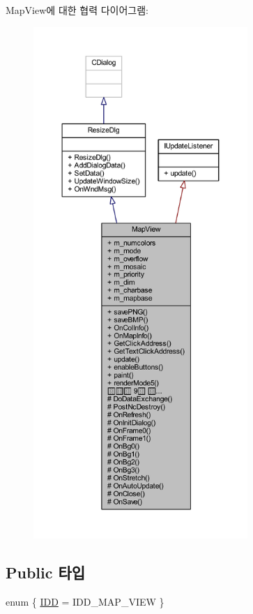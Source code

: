Map\+View에 대한 협력 다이어그램\+:\nopagebreak
\begin{figure}[H]
\begin{center}
\leavevmode
\includegraphics[height=550pt]{class_map_view__coll__graph}
\end{center}
\end{figure}
\subsection*{Public 타입}
\begin{DoxyCompactItemize}
\item 
enum \{ \mbox{\hyperlink{class_map_view_ad398582947c2a9b34e2217a782349299a9bcd3b06eb8616269560902b0a5ca782}{I\+DD}} = I\+D\+D\+\_\+\+M\+A\+P\+\_\+\+V\+I\+EW
 \}
\end{DoxyCompactItemize}
